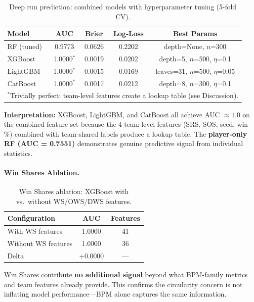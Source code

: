 \documentclass[12pt, a4paper]{article}
\begin{document}
\begin{table}[H]
\centering
\caption{Deep run prediction: combined models with hyperparameter tuning (5-fold CV).}
\label{tab:cv-results}
\begin{tabular}{@{}lcccc@{}}
\toprule
\textbf{Model} & \textbf{AUC} & \textbf{Brier} & \textbf{Log-Loss} & \textbf{Best Params} \\
\midrule
RF (tuned) & 0.9773 & 0.0626 & 0.2202 & depth=None, $n$=300 \\
XGBoost & 1.0000$^*$ & 0.0019 & 0.0202 & depth=5, $n$=500, $\eta$=0.1 \\
LightGBM & 1.0000$^*$ & 0.0015 & 0.0169 & leaves=31, $n$=500, $\eta$=0.05 \\
CatBoost & 1.0000$^*$ & 0.0017 & 0.0212 & depth=8, $n$=300, $\eta$=0.1 \\
\bottomrule
\multicolumn{5}{l}{\footnotesize $^*$Trivially perfect: team-level features create a lookup table (see Discussion).}
\end{tabular}
\end{table}

\textbf{Interpretation:} XGBoost, LightGBM, and CatBoost all achieve AUC $\approx 1.0$ on the combined feature set because the 4 team-level features (SRS, SOS, seed, win \%) combined with team-shared labels produce a lookup table. The \textbf{player-only RF (AUC = 0.7551)} demonstrates genuine predictive signal from individual statistics.

\paragraph{Win Shares Ablation.}

\begin{table}[H]
\centering
\caption{Win Shares ablation: XGBoost with vs.\ without WS/OWS/DWS features.}
\begin{tabular}{@{}lcc@{}}
\toprule
\textbf{Configuration} & \textbf{AUC} & \textbf{Features} \\
\midrule
With WS features & 1.0000 & 41 \\
Without WS features & 1.0000 & 36 \\
Delta & +0.0000 & --- \\
\bottomrule
\end{tabular}
\end{table}

Win Shares contribute \textbf{no additional signal} beyond what BPM-family metrics and team features already provide. This confirms the circularity concern is not inflating model performance---BPM alone captures the same information.
\end{document}
